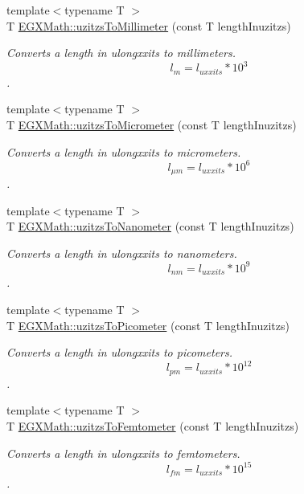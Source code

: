 \begin{DoxyCompactItemize}
{\footnotesize template$<$typename T $>$ }\\T \mbox{\hyperlink{group___e_g_x_math-_conversions-_length_conversions-uzitzs-_s_i_gaf507dd646327861da523586b417d132e}{E\+G\+X\+Math\+::uzitzs\+To\+Millimeter}} (const T length\+Inuzitzs)
\begin{DoxyCompactList}\small\item\em Converts a length in ulongxxits to millimeters. \[ l_{m}=l_{uxxits} * 10^{3} \]. \end{DoxyCompactList}\item 
{\footnotesize template$<$typename T $>$ }\\T \mbox{\hyperlink{group___e_g_x_math-_conversions-_length_conversions-uzitzs-_s_i_ga0bd484a80b8b66cd5272bbbc1fe6b642}{E\+G\+X\+Math\+::uzitzs\+To\+Micrometer}} (const T length\+Inuzitzs)
\begin{DoxyCompactList}\small\item\em Converts a length in ulongxxits to micrometers. \[ l_{\mu m}=l_{uxxits} * 10^{6} \]. \end{DoxyCompactList}\item 
{\footnotesize template$<$typename T $>$ }\\T \mbox{\hyperlink{group___e_g_x_math-_conversions-_length_conversions-uzitzs-_s_i_ga6c21ffa2ef282d817d349c249eaaa21f}{E\+G\+X\+Math\+::uzitzs\+To\+Nanometer}} (const T length\+Inuzitzs)
\begin{DoxyCompactList}\small\item\em Converts a length in ulongxxits to nanometers. \[ l_{nm}=l_{uxxits} * 10^{9} \]. \end{DoxyCompactList}\item 
{\footnotesize template$<$typename T $>$ }\\T \mbox{\hyperlink{group___e_g_x_math-_conversions-_length_conversions-uzitzs-_s_i_ga48c60a4876ac426d1717096263648a4d}{E\+G\+X\+Math\+::uzitzs\+To\+Picometer}} (const T length\+Inuzitzs)
\begin{DoxyCompactList}\small\item\em Converts a length in ulongxxits to picometers. \[ l_{pm}=l_{uxxits} * 10^{12} \]. \end{DoxyCompactList}\item 
{\footnotesize template$<$typename T $>$ }\\T \mbox{\hyperlink{group___e_g_x_math-_conversions-_length_conversions-uzitzs-_s_i_ga55b363df9781c5d92c86bcef272dfc7f}{E\+G\+X\+Math\+::uzitzs\+To\+Femtometer}} (const T length\+Inuzitzs)
\begin{DoxyCompactList}\small\item\em Converts a length in ulongxxits to femtometers. \[ l_{fm}=l_{uxxits} * 10^{15} \]. \end{DoxyCompactList}\item 

\end{DoxyCompactItemize}
